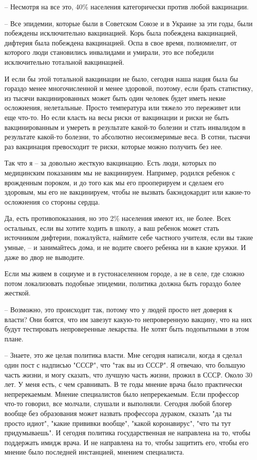 – Несмотря на все это, 40\% населения категорически против любой вакцинации.  

– Все эпидемии, которые были в Советском Союзе и в Украине за эти годы, были
побеждены исключительно вакцинацией. Корь была побеждена вакцинацией, дифтерия
была побеждена вакцинацией. Оспа в свое время, полиомиелит, от которого люди
становились инвалидами и умирали, это все победили исключительно тотальной
вакцинацией. 

И если бы этой тотальной вакцинации не было, сегодня наша нация была бы гораздо
менее многочисленной и менее здоровой, поэтому, если брать статистику, из
тысячи вакцинированных может быть один человек будет иметь некие осложнения,
нелетальные. Просто температура или тяжело это переживет или еще что-то. Но
если класть на весы риски от вакцинации и риски не быть вакцинированным и
умереть в результате какой-то болезни и стать инвалидом в результате какой-то
болезни, то абсолютно несоизмеримые веса. В сотни, тысячи раз вакцинация
превосходит те риски, которые можно получить без нее. 

Так что я – за довольно жесткую вакцинацию. Есть люди, которых по медицинским
показаниям мы не вакцинируем. Например, родился ребенок с врожденным пороком, и
до того как мы его прооперируем и сделаем его здоровым, мы его не вакцинируем,
чтобы не вызвать бакэндокардит или какие-то осложнения со стороны сердца.

Да, есть противопоказания, но это 2\% населения имеют их, не более. Всех
остальных, если вы хотите ходить в школу, а ваш ребенок может стать источником
дифтерии, пожалуйста, наймите себе частного учителя, если вы такие умные, – и
занимайтесь дома, и не водите своего ребенка ни в какие кружки. И даже во двор
не выводите. 

Если мы живем в социуме и в густонаселенном городе, а не в селе, где сложно
потом локализовать подобные эпидемии, политика должна быть гораздо более
жесткой. 

– Возможно, это происходит так, потому что у людей просто нет доверия к власти?
Они боятся, что им завезут какую-то непроверенную вакцину, что на них будут
тестировать непроверенные лекарства. Не хотят быть подопытными в этом плане.

– Знаете, это же целая политика власти. Мне сегодня написали, когда я сделал
один пост с надписью "СССР", что "так вы из СССР". Я отвечаю, что большую часть
жизни, и могу сказать, что лучшую часть жизни, прожил в СССР. Около 30 лет. У
меня есть, с чем сравнивать. В те годы мнение врача было практически
непререкаемым. Мнение специалистов было непререкаемым. Если профессор что-то
говорил, все молчали, слушали и выполняли. Сегодня любой блогер вообще без
образования может назвать профессора дураком, сказать "да ты просто идиот",
"какие прививки вообще", "какой коронавирус", "что ты тут придумываешь". И
сегодня политика государственная не направлена на то, чтобы поддержать имидж
врача. И не направлена на то, чтобы защитить его, чтобы его мнение было
последней инстанцией, мнением специалиста.

